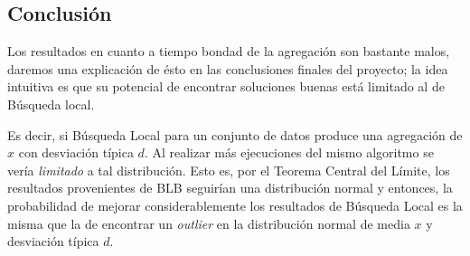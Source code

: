 \subsection{Conclusión}  

Los resultados en cuanto a tiempo bondad de la agregación 
son bastante malos, daremos una explicación de ésto en las conclusiones 
finales del proyecto; la idea intuitiva es 
que su potencial de encontrar soluciones buenas 
está limitado al de Búsqueda local. 

Es decir, si Búsqueda Local para un conjunto de datos produce 
una agregación de $x$ con desviación típica $d$. Al realizar 
más ejecuciones del mismo algoritmo se vería \textit{limitado} a tal distribución. Esto es, por 
el Teorema Central del Límite, los 
resultados provenientes de BLB seguirían una distribución normal y entonces, la probabilidad 
de mejorar considerablemente  los resultados de Búsqueda Local 
es la misma que la de encontrar un \textit{outlier} en la distribución 
normal de media $x$ y desviación típica $d$. 




